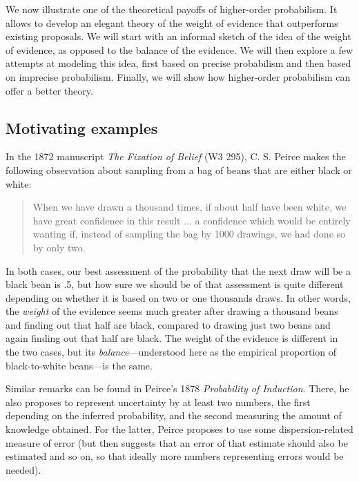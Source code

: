 \documentclass[
  10pt,
  dvipsnames,enabledeprecatedfontcommands]{scrartcl}
\begin{document}
We now illustrate one of the theoretical payoffs of higher-order
probabilism. It allows to develop an elegant theory of the weight of
evidence that outperforms existing proposals. We will start with an
informal sketch of the idea of the weight of evidence, as opposed to the
balance of the evidence. We will then explore a few attempts at modeling
this idea, first based on precise probabilism and then based on
imprecise probabilism. Finally, we will show how higher-order
probabilism can offer a better theory.

\hypertarget{motivating-examples}{%
\subsection{Motivating examples}\label{motivating-examples}}

In the 1872 manuscript \emph{The Fixation of Belief} (W3 295), C. S.
Peirce makes the following observation about sampling from a bag of
beans that are either black or white:

\begin{quote} When we have drawn a thousand times, if about half have been white, we have great confidence in this result ... a confidence which would be entirely wanting if, instead of sampling the bag by 1000 drawings, we had done so by only two.
\end{quote}

\noindent In both cases, our best assessment of the probability that the
next draw will be a black bean is .5, but how sure we should be of that
assessment is quite different depending on whether it is based on two or
one thousands draws. In other words, the \emph{weight} of the evidence
seems much greater after drawing a thousand beans and finding out that
half are black, compared to drawing just two beans and again finding out
that half are black. The weight of the evidence is different in the two
cases, but its \emph{balance}---understood here as the empirical
proportion of black-to-white beans---is the same.

Similar remarks can be found in Peirce's 1878
\emph{Probability of Induction}. There, he also proposes to represent
uncertainty by at least two numbers, the first depending on the inferred
probability, and the second measuring the amount of knowledge obtained.
For the latter, Peirce proposes to use some dispersion-related measure
of error (but then suggests that an error of that estimate should also
be estimated and so on, so that ideally more numbers representing errors
would be needed).
\end{document}
